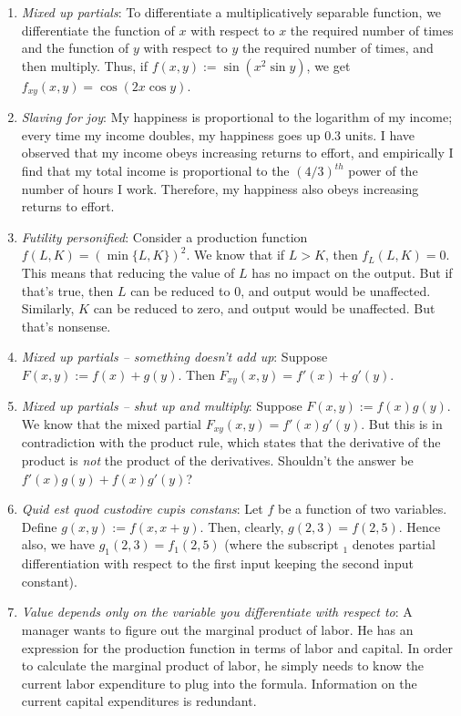 \documentclass[10pt]{amsart}
\begin{document}
\begin{enumerate}
\item {\em Mixed up partials}: To differentiate a multiplicatively
  separable function, we differentiate the function of $x$ with
  respect to $x$ the required number of times and the function of $y$
  with respect to $y$ the required number of times, and then
  multiply. Thus, if $f(x,y) := \sin(x^2\sin y)$, we get $f_{xy}(x,y)
  = \cos(2x\cos y)$.
\item {\em Slaving for joy}: My happiness is proportional to the
  logarithm of my income; every time my income doubles, my happiness
  goes up $0.3$ units. I have observed that my income obeys increasing
  returns to effort, and empirically I find that my total income is
  proportional to the $(4/3)^{th}$ power of the number of hours I
  work. Therefore, my happiness also obeys increasing returns to
  effort.
\item {\em Futility personified}: Consider a production function
  $f(L,K) = (\min \{ L, K \})^2$. We know that if $L > K$, then
  $f_L(L,K) = 0$. This means that reducing the value of $L$ has no
  impact on the output. But if that's true, then $L$ can be reduced to
  $0$, and output would be unaffected. Similarly, $K$ can be reduced
  to zero, and output would be unaffected. But that's nonsense.
\item {\em Mixed up partials -- something doesn't add up}: Suppose
  $F(x,y) := f(x) + g(y)$. Then $F_{xy}(x,y) = f'(x) + g'(y)$.
\item {\em Mixed up partials -- shut up and multiply}: Suppose $F(x,y)
  := f(x)g(y)$. We know that the mixed partial $F_{xy}(x,y) =
  f'(x)g'(y)$. But this is in contradiction with the product rule,
  which states that the derivative of the product is {\em not} the
  product of the derivatives. Shouldn't the answer be $f'(x)g(y) +
  f(x)g'(y)$?
\item {\em Quid est quod custodire cupis constans}: Let $f$ be a
  function of two variables. Define $g(x,y) := f(x,x + y)$. Then,
  clearly, $g(2,3) = f(2,5)$. Hence also, we have $g_1(2,3) =
  f_1(2,5)$ (where the subscript $_1$ denotes partial differentiation
  with respect to the first input keeping the second input constant).
\item {\em Value depends only on the variable you differentiate with
  respect to}: A manager wants to figure out the marginal product of
  labor. He has an expression for the production function in terms of
  labor and capital. In order to calculate the marginal product of
  labor, he simply needs to know the current labor expenditure to plug
  into the formula. Information on the current capital expenditures is
  redundant.
\end{enumerate}
\end{document}
